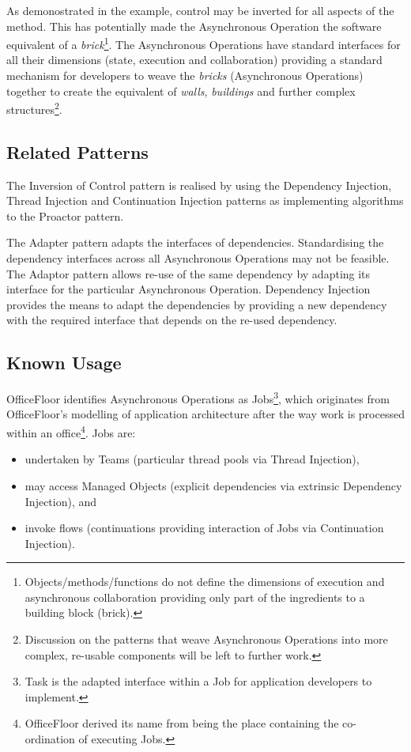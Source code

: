 \documentclass[prodmode]{style/acmlarge}
\begin{document}
As demonostrated in the example, control may be inverted for all aspects of the
method.  This has potentially made the Asynchronous Operation the software
equivalent of a \textit{brick}\footnote{Objects/methods/functions do not define
the dimensions of execution and asynchronous collaboration providing only part
of the ingredients to a building block (brick).}.  The Asynchronous Operations
have standard interfaces for all their dimensions (state, execution and
collaboration) providing a standard mechanism for developers to weave the
\textit{bricks} (Asynchronous Operations) together to create the equivalent of
\textit{walls}, \textit{buildings} and further complex
structures\footnote{Discussion on the patterns that weave Asynchronous
Operations into more complex, re-usable components will be left to further
work.}.


\subsection{Related Patterns}

The Inversion of Control pattern is realised by using the Dependency Injection,
Thread Injection and Continuation Injection patterns as implementing algorithms
to the Proactor pattern.

The Adapter pattern \cite{gof} adapts the interfaces of dependencies.
Standardising the dependency interfaces across all Asynchronous Operations may
not be feasible.  The Adaptor pattern allows re-use of the same dependency by
adapting its interface for the particular Asynchronous Operation.  Dependency
Injection provides the means to adapt the dependencies by providing a new
dependency with the required interface that depends on the re-used dependency.


\subsection{Known Usage}

OfficeFloor \cite{officefloor} identifies Asynchronous Operations as
Jobs\footnote{Task is the adapted interface within a Job for application
developers to implement.}, which originates from OfficeFloor's modelling of
application architecture after the way work is processed within an
office\footnote{OfficeFloor derived its name from being the place containing the
co-ordination of executing Jobs.}.  Jobs are:
\begin{itemize}
  \item undertaken by Teams (particular thread pools via Thread Injection),
  \item may access Managed Objects (explicit dependencies via extrinsic Dependency Injection), and
  \item invoke flows (continuations providing interaction of Jobs via Continuation Injection).
\end{itemize}
\end{document}
